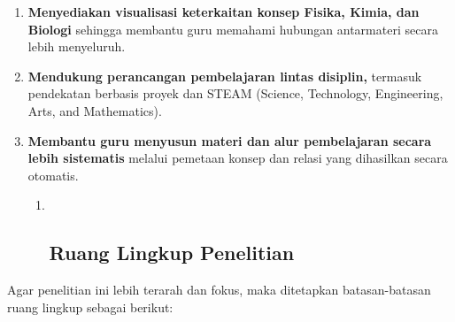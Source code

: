 \documentclass[
]{article}
\begin{document}
\begin{enumerate}
\def\labelenumi{\arabic{enumi}.}
\item
  \textbf{Menyediakan visualisasi keterkaitan konsep Fisika, Kimia, dan
  Biologi} sehingga membantu guru memahami hubungan antarmateri secara
  lebih menyeluruh.
\item
  \textbf{Mendukung perancangan pembelajaran lintas disiplin,} termasuk
  pendekatan berbasis proyek dan STEAM (Science, Technology,
  Engineering, Arts, and Mathematics).
\item
  \textbf{Membantu guru menyusun materi dan alur pembelajaran secara
  lebih sistematis} melalui pemetaan konsep dan relasi yang dihasilkan
  secara otomatis.

  \begin{enumerate}
  \def\labelenumii{\arabic{enumii}.}
  \item ~
    \hypertarget{ruang-lingkup-penelitian}{%
    \subsection{Ruang Lingkup
    Penelitian}\label{ruang-lingkup-penelitian}}
  \end{enumerate}
\end{enumerate}

Agar penelitian ini lebih terarah dan fokus, maka ditetapkan
batasan-batasan ruang lingkup sebagai berikut:
\end{document}
